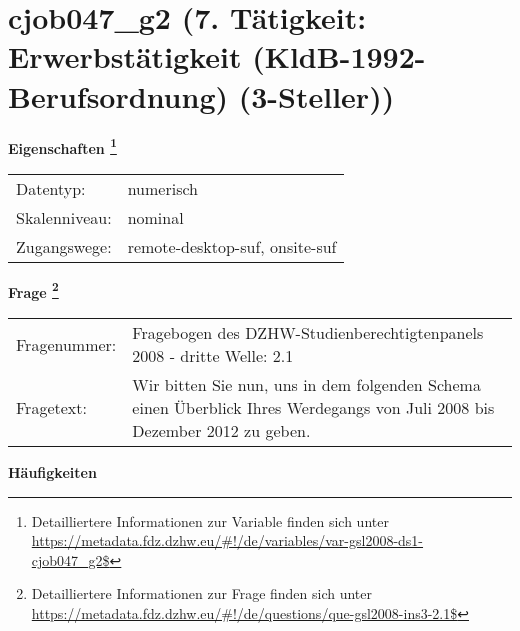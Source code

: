 
    \setcounter{footnote}{0}

    \vspace*{-1.8cm}
	\section{cjob047\_g2 (7. Tätigkeit: Erwerbstätigkeit (KldB-1992-Berufsordnung) (3-Steller))}
	\label{section:cjob047_g2}



    \vspace*{0.5cm}
    \noindent\textbf{Eigenschaften
	\footnote{Detailliertere Informationen zur Variable finden sich unter
		\url{https://metadata.fdz.dzhw.eu/\#!/de/variables/var-gsl2008-ds1-cjob047_g2$}}}\\
	\begin{tabularx}{\hsize}{@{}lX}
	Datentyp: & numerisch \\
	Skalenniveau: & nominal \\
	Zugangswege: &
	  remote-desktop-suf, 
	  onsite-suf
 \\
    \end{tabularx}



				\vspace*{0.5cm}
                \noindent\textbf{Frage
	                \footnote{Detailliertere Informationen zur Frage finden sich unter
		              \url{https://metadata.fdz.dzhw.eu/\#!/de/questions/que-gsl2008-ins3-2.1$}}}\\
				\begin{tabularx}{\hsize}{@{}lX}
					Fragenummer: &
					  Fragebogen des DZHW-Studienberechtigtenpanels 2008 - dritte Welle:
					  2.1
 \\
					Fragetext: & Wir bitten Sie nun, uns in dem folgenden Schema einen Überblick Ihres Werdegangs von Juli 2008 bis Dezember 2012 zu geben. \\
				\end{tabularx}





        		\vspace*{0.5cm}
                \noindent\textbf{Häufigkeiten}

